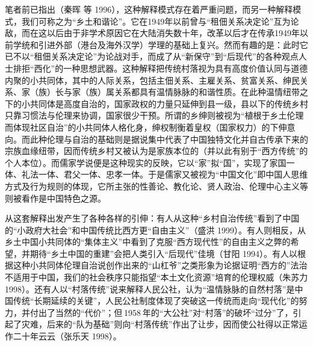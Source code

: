 \documentclass[a4paper,12pt,punct=kaiming,fontset=none]{ctexart}
\begin{document}
笔者前已指出（秦晖 等 1996），这种解释模式存在着严重问题，而另一种解释模式，我们可称之为“乡土和谐论”。它在1949年以前曾与“租佃关系决定论”互为论敌，而在这以后由于非学术原因它在大陆消失数十年，改革以后才在传承1949年以前学统和引进外部（港台及海外汉学）学理的基础上复兴。然而有趣的是：此时它已不以“租佃关系决定论”为论战对手，而成了从“新保守”到“后现代”的各种观点人士排拒“西化”的一种思想武器。这种解释把传统村落视为具有高度价值认同与道德内聚的小共同体，其中的人际关系，包括主佃关系、主雇关系、贫富关系、绅民关系、家（族）长与家（族）属关系都具有温情脉脉的和谐性质。在此种温情纽带之下的小共同体是高度自治的，国家政权的力量只延伸到县一级，县以下的传统乡村只靠习惯法与伦理来协调，国家很少干预。所谓的乡绅则被视为“植根于乡土伦理而体现社区自治”的小共同体人格化身，绅权制衡着皇权（国家权力）的下伸意向。而此种伦理与自治的基础则是据说集中代表了中国独特文化并自古传承下来的宗族血缘纽带，因而传统乡村又被认为是家族本位的（并以此有别于“西方传统”的个人本位）。而儒家学说便是这种现实的反映，它以“家”拟“国”，实现了家国一体、礼法一体、君父一体、忠孝一体。于是儒家又被视为“中国文化”即中国人思维方式及行为规则的体现，它所主张的性善论、教化论、贤人政治、伦理中心主义等则被看作是中国特色之源。

从这套解释出发产生了各种各样的引伸：有人从这种“乡村自治传统”看到了中国的“小政府大社会”和中国传统比西方更“自由主义”（盛洪 1999）。有人则相反，从乡土中国小共同体的“集体主义”中看到了克服“西方现代性”的自由主义之弊的希望，并期待“乡土中国的重建”会把人类引入“后现代”佳境（甘阳 1994）。有人以根据这种小共同体伦理自治说创作出来的“山杠爷”之类形象为论据证明“西方的”法治不适用于中国，我们的社会秩序只能指望“本土文化资源”培育的伦理权威（朱苏力 1998）。还有人以“村落传统”说来解释人民公社，认为“温情脉脉的自然村落”是中国传统“长期延续的关键”，人民公社制度体现了突破这一传统而走向“现代化”的努力，并付出了当然的“代价”；但 1958 年的“大公社”对“村落”的破坏“过分”了，引起了灾难，后来的“队为基础”则向“村落传统”作出了让步，因而使公社得以正常运作二十年云云（张乐天 1998）。
\end{document}
